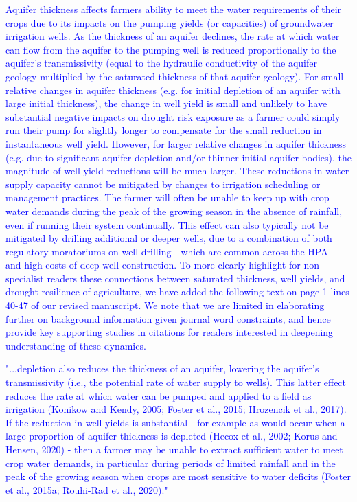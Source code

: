 \documentclass[
]{article}
\begin{document}
\textcolor{blue}{Aquifer thickness affects farmers ability to meet the water requirements of their crops due to its impacts on the pumping yields (or capacities) of groundwater irrigation wells. As the thickness of an aquifer declines, the rate at which water can flow from the aquifer to the pumping well is reduced proportionally to the aquifer's transmissivity (equal to the hydraulic conductivity of the aquifer geology multiplied by the saturated thickness of that aquifer geology). For small relative changes in aquifer thickness (e.g. for initial depletion of an aquifer with large initial thickness), the change in well yield is small and unlikely to have substantial negative impacts on drought risk exposure as a farmer could simply run their pump for slightly longer to compensate for the small reduction in instantaneous well yield. However, for larger relative changes in aquifer thickness (e.g. due to significant aquifer depletion and/or thinner initial aquifer bodies), the magnitude of well yield reductions will be much larger. These reductions in water supply capacity cannot be mitigated by changes to irrigation scheduling or management practices. The farmer will often be unable to keep up with crop water demands during the peak of the growing season in the absence of rainfall, even if running their system continually. This effect can also typically not be mitigated by drilling additional or deeper wells, due to a combination of both regulatory moratoriums on well drilling - which are common across the HPA - and high costs of deep well construction. To more clearly highlight for non-specialist readers these connections between saturated thickness, well yields, and drought resilience of agriculture, we have added the following text on page 1 lines 40-47 of our revised manuscript. We note that we are limited in elaborating further on background information given journal word constraints, and hence provide key supporting studies in citations for readers interested in deepening understanding of these dynamics.}

\textcolor{blue}{"...depletion also reduces the thickness of an aquifer, lowering the aquifer's transmissivity (i.e., the potential rate of water supply to wells). This latter effect reduces the rate at which water can be pumped and applied to a field as irrigation (Konikow and Kendy, 2005; Foster et al., 2015; Hrozencik et al., 2017). If the reduction in well yields is substantial - for example as would occur when a large proportion of aquifer thickness is depleted (Hecox et al., 2002; Korus and Hensen, 2020) - then a farmer may be unable to extract sufficient water to meet crop water demands, in particular during periods of limited rainfall and in the peak of the growing season when crops are most sensitive to water deficits (Foster et al., 2015a; Rouhi-Rad et al., 2020)."
}
\end{document}
